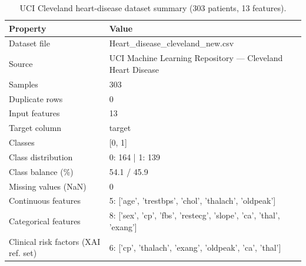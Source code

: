 \begin{table}[t]
\centering
\caption{UCI Cleveland heart-disease dataset summary (303 patients, 13 features).}
\label{tab:datasetsummary}
\small
\begin{tabular}{p{3.1cm}p{4.6cm}}
\toprule
Property & Value \\
\midrule
Dataset file & Heart\_disease\_cleveland\_new.csv \\
Source & UCI Machine Learning Repository --- Cleveland Heart Disease \\
Samples & 303 \\
Duplicate rows & 0 \\
Input features & 13 \\
Target column & target \\
Classes & [0, 1] \\
Class distribution & 0: 164  |  1: 139 \\
Class balance (\%) & 54.1 / 45.9 \\
Missing values (NaN) & 0 \\
Continuous features & 5: ['age', 'trestbps', 'chol', 'thalach', 'oldpeak'] \\
Categorical features & 8: ['sex', 'cp', 'fbs', 'restecg', 'slope', 'ca', 'thal', 'exang'] \\
Clinical risk factors (XAI ref. set) & 6: ['cp', 'thalach', 'exang', 'oldpeak', 'ca', 'thal'] \\
\bottomrule
\end{tabular}
\end{table}
